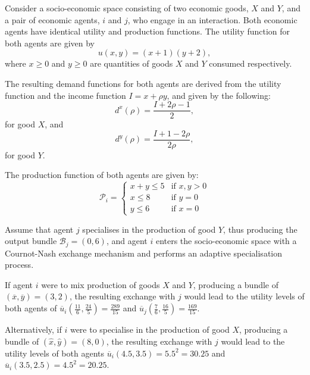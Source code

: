 \begin{example} \label{ex:Cournot-Nash}
Consider a socio-economic space consisting of two economic goods, $X$ and $Y$, and a pair of economic agents, $i$ and $j$, who engage in an interaction. Both economic agents have identical utility and production functions. The utility function for both agents are given by
\begin{equation}
    u(x,y) = (x + 1) (y + 2) ,
\end{equation}
where $x \geqslant 0$ and $y \geqslant 0$ are quantities of goods $X$ and $Y$ consumed respectively.

The resulting demand functions for both agents are derived from the utility function and the income function $I = x + \rho y$, and given by the following:
\begin{equation}
d^{x}(\rho) = \frac{I + 2 \rho - 1}{2} ,
\end{equation}
for good $X$, and
\begin{equation}
d^{y}(\rho) = \frac{I + 1 - 2 \rho }{2 \rho} ,
\end{equation}
for good $Y$.

The production function of both agents are given by:
\[ \mathcal{P}_{i} = \left\{ \begin{array}{ll}
         x + y \leqslant 5 & \mbox{if $x,y > 0$}\\
		 x \leqslant 8 & \mbox{if $y = 0$}\\
         y \leqslant 6 & \mbox{if $x = 0$}\end{array} \right. \]

Assume that agent $j$ specialises in the production of good $Y$, thus producing the output bundle $\mathcal{B}_{j} = (0,6)$, and agent $i$ enters the socio-economic space with a Cournot-Nash exchange mechanism and performs an adaptive specialisation process.

If agent $i$ were to mix production of goods $X$ and $Y$, producing a bundle of $(\overline{x}, \overline{y}) = (3,2)$, the resulting exchange with $j$ would lead to the utility levels of both agents of $\overline{u}_{i} \left( \frac{11}{6}, \frac{24}{5} \right) = \frac{289}{15}$ and $\overline{u}_{j} \left( \frac{7}{6}, \frac{16}{5} \right) = \frac{169}{15}$.

Alternatively, if $i$ were to specialise in the production of good $X$, producing a bundle of $(\hat{x}, \hat{y}) = (8,0)$, the resulting exchange with $j$ would lead to the utility levels of both agents $\overline{u}_{i} \left( 4.5, 3.5 \right) = 5.5^2 = 30.25$ and $\overline{u}_{i} \left( 3.5, 2.5 \right) = 4.5^2 = 20.25$.


\end{example}
